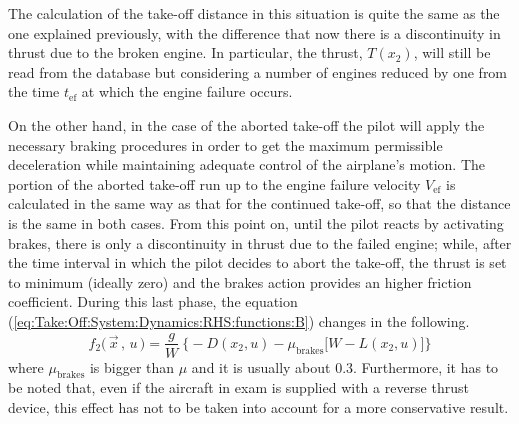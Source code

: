 \bigskip
\noindent
The calculation of the take-off distance in this situation is quite the same as the one explained previously, with the difference that now there is a discontinuity in thrust due to the broken engine. In particular, the thrust, $T(x_2)$, will still be read from the database but considering a number of engines reduced by one from the time $t_{\text{ef}}$ at which the engine failure occurs.

\bigskip
\noindent
On the other hand, in the case of the aborted take-off the pilot will apply the necessary braking procedures in order to get the maximum permissible deceleration while maintaining adequate control of the airplane’s motion. The portion of the aborted take-off run up to the engine failure velocity $V_{\text{ef}}$ is calculated in the same way as that for the continued take-off, so that the distance is the same in both cases. 
%
From this point on, until the pilot reacts by activating brakes, there is only a discontinuity in thrust due to the failed engine; while, after the time interval in which the pilot decides to abort the take-off, the thrust is set to minimum (ideally zero) and the brakes action provides an higher friction coefficient. During this last phase, the equation (\ref{eq:Take:Off:System:Dynamics:RHS:functions:B}) changes in the following.
%
\begin{equation}\label{eq:Take:Off:System:Dynamics:RHS:functions:Aborted}
f_2 \big(\, \vec{x}\,,\,u \,\big) =\frac{g}{W}\ \big\{ - D(x_2,u) - \mu_{\text{brakes}} \big[ W - L(x_2,u) \big]\big\} 
\end{equation}
%
where $\mu_{\text{brakes}}$ is bigger than $\mu$ and it is usually about 0.3.
%
Furthermore, it has to be noted that, even if the aircraft in exam is supplied with a reverse thrust device, this effect has not to be taken into account for a more conservative result. 

